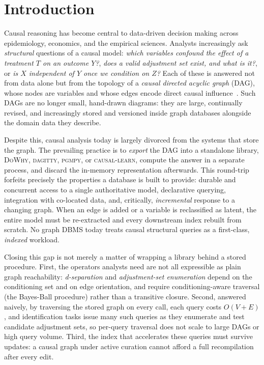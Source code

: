 \section{Introduction}\label{sec:intro}

Causal reasoning has become central to data-driven decision making across
epidemiology, economics, and the empirical sciences. Analysts increasingly ask
\emph{structural} questions of a causal model: \emph{which variables confound
the effect of a treatment $T$ on an outcome $Y$?}, \emph{does a valid adjustment
set exist, and what is it?}, or \emph{is $X$ independent of $Y$ once we condition
on $Z$?} Each of these is answered not from data alone but from the topology of a
\emph{causal directed acyclic graph} (DAG), whose nodes are variables and whose
edges encode direct causal influence~\cite{pearl2009causality}. Such DAGs are no
longer small, hand-drawn diagrams: they are large, continually revised, and
increasingly stored and versioned inside graph databases alongside the domain
data they describe.

Despite this, causal analysis today is largely divorced from the systems that
store the graph. The prevailing practice is to \emph{export} the DAG into a
standalone library,  \textsc{DoWhy}, \textsc{dagitty}, \textsc{pgmpy}, or
\textsc{causal-learn},  compute the answer in a separate process, and discard the
in-memory representation afterwards. This round-trip forfeits precisely the
properties a database is built to provide: durable and concurrent access to a
single authoritative model, declarative querying, integration with co-located
data, and,  critically,  \emph{incremental} response to a changing graph. When an
edge is added or a variable is reclassified as latent, the entire model must be
re-extracted and every downstream index rebuilt from scratch. No graph DBMS
today treats causal structural queries as a first-class, \emph{indexed} workload.

Closing this gap is not merely a matter of wrapping a library behind a stored
procedure. First, the operators analysts need are not all expressible as plain
graph reachability: \emph{d-separation} and \emph{adjustment-set enumeration}
depend on the conditioning set and on edge orientation, and require
conditioning-aware traversal (the Bayes-Ball procedure) rather than a transitive
closure. Second, answered naively,  by traversing the stored graph on every
call,  each query costs $O(V{+}E)$, and identification tasks issue many such
queries as they enumerate and test candidate adjustment sets, so per-query
traversal does not scale to large DAGs or high query volume. Third, the index
that accelerates these queries must survive updates: a causal graph under active
curation cannot afford a full recompilation after every edit.

